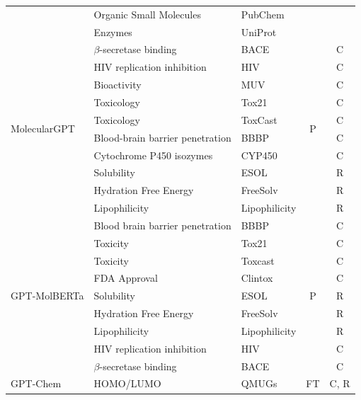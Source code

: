 \begin{table}[htbp]
{\begin{tabular}{lllcc}
        & Organic Small Molecules & PubChem\\
        & Enzymes & UniProt\\
        \midrule
        \multirow{10}{*}{MolecularGPT\autocite{liu2024moleculargpt}} & $\beta$-secretase binding & BACE \autocite{wu2018moleculenet} & \multirow{10}{*}{P} & C\\
        & HIV replication inhibition & HIV\autocite{wu2018moleculenet} & & C\\
        & Bioactivity & MUV \autocite{rohrer2009maximum} & & C\\
        & Toxicology & Tox21 \autocite{richard_tox21_2021} & & C \\
        & Toxicology & ToxCast \autocite{us2015toxicity} & & C\\
        & Blood-brain barrier penetration & BBBP\autocite{sakiyama_prediction_2021} & & C\\
        & Cytochrome P450 isozymes & CYP450 \autocite{ni2025curated} & & C\\
        & Solubility & ESOL \autocite{delaneyesol2004} & & R\\
        & Hydration Free Energy & FreeSolv \autocite{mobley_freesolv_2014}& & R\\
        & Lipophilicity& Lipophilicity\autocite{wu2018moleculenet} & & R\\
        \midrule
        \multirow{9}{*}{GPT-MolBERTa \autocite{balaji2023gptmolberta}} & Blood brain barrier penetration & BBBP\autocite{sakiyama_prediction_2021} & \multirow{9}{*}{P} & C\\
        & Toxicity & Tox21 \autocite{richard_tox21_2021} & & C\\
        & Toxicity & Toxcast \autocite{us2015toxicity} & & C\\
        & FDA Approval & Clintox \autocite{wu2018moleculenet} & & C \\
        & Solubility & ESOL \autocite{delaneyesol2004} & & R\\
        & Hydration Free Energy& FreeSolv\autocite{mobley_freesolv_2014} & &R \\
        & Lipophilicity & Lipophilicity \autocite{wu2018moleculenet}& & R\\
        & HIV replication inhibition& HIV\autocite{wu2018moleculenet} & & C\\
        &  $\beta$-secretase binding & BACE \autocite{wu2018moleculenet} & &  C\\
        \midrule
        \multirow{7}{*}{GPT-Chem\autocite{jablonka2024leveraging}} & HOMO/LUMO & QMUGs\autocite{isert_qmugs_2022} & \multirow{7}{*}{FT} & C, R \\

\end{tabular}}
\end{table}
